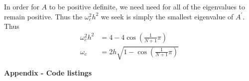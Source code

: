 \documentclass[12pt]{article}
\begin{document}
In order for $A$ to be positive definite, we need need for all of the eigenvalues to remain positive. Thus the $\omega_c^2h^2$ we seek is simply the smallest eigenvalue of $A^\prime$. Thus
\begin{align*}
	\omega_c^2h^2 & = 4 - 4 \cos\left(\frac{1 }{N+1}\pi \right) \\
	\omega_c & = 2h \sqrt{1- \cos\left(\frac{1 }{N+1}\pi \right)}
\end{align*}


\bigbreak

{\hspace{-4 ex} \huge \textbf{Appendix - Code listings}}\bigbreak
\end{document}
